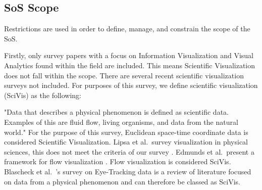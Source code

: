 
\subsection{SoS Scope} \label{sec:scope}
Restrictions are used in order to define, manage, and constrain the scope of the SoS. 

Firstly, only survey papers with a focus on Information Visualization and Visual Analytics found within the field are included. This means Scientific Visualization does not fall within the scope. There are several recent scientific visualization surveys not included. For purposes of this survey, we define scientific visualization (SciVis) as the following:

"Data that describes a physical phenomenon is defined as scientific data. Examples of this are fluid flow, living organisms, and data from the natural world."  For the purpose of this survey, Euclidean space-time coordinate data is considered Scientific Visualization. Lipsa et al.\ survey visualization in physical sciences, this does not meet the criteria of our survey \cite{lipsa2012visualization}. Edmunds et al.\ present a framework for flow visualization \cite{edmunds2012surface}. Flow visualization is considered SciVis. Blascheck et al.\ 's survey on Eye-Tracking data is a review of literature focused on data from a physical phenomenon and can therefore be classed as SciVis\cite{blascheck2014state}.

